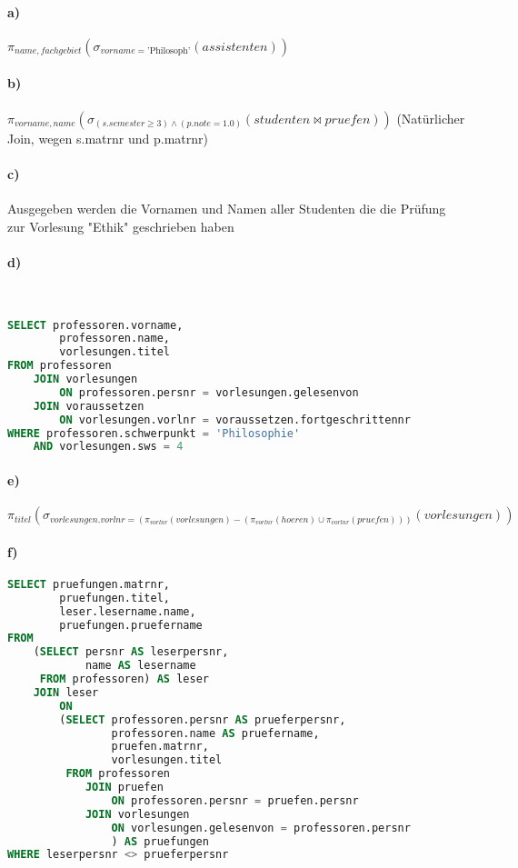 \documentclass[11pt,a4paper,parskip=half ]{scrartcl}
\begin{document}
	\paragraph*{a)} $\pi_{name, fachgebiet}(\sigma_{vorname = \text{'Philosoph'}}(assistenten))$
	
	\paragraph{b)} $\pi_{vorname, name}(\sigma_{(s.semester \geq 3) \wedge (p.note = 1.0)}(studenten\bowtie pruefen))$ (Natürlicher Join, wegen s.matrnr und p.matrnr)
	
	\paragraph{c)}Ausgegeben werden die Vornamen und Namen aller Studenten die die Prüfung zur Vorlesung "Ethik" geschrieben haben
	
	\paragraph{d)}~
	\begin{lstlisting}[language=SQL]
SELECT professoren.vorname, 
		professoren.name, 
		vorlesungen.titel
FROM professoren
	JOIN vorlesungen 
		ON professoren.persnr = vorlesungen.gelesenvon
	JOIN voraussetzen 
		ON vorlesungen.vorlnr = voraussetzen.fortgeschrittennr
WHERE professoren.schwerpunkt = 'Philosophie' 
	AND vorlesungen.sws = 4
	\end{lstlisting}
	
	\paragraph{e)}$\pi_{titel}(\sigma_{vorlesungen.vorlnr = (\pi_{vorlnr}(vorlesungen) - (\pi_{vorlnr}(hoeren) \cup \pi_{vorlnr}(pruefen)))}(vorlesungen))$
	
	\paragraph{f)}
	\begin{lstlisting}[language=SQL]
SELECT pruefungen.matrnr,
		pruefungen.titel,
		leser.lesername.name, 
		pruefungen.pruefername
FROM 
	(SELECT persnr AS leserpersnr, 
			name AS lesername
	 FROM professoren) AS leser
	JOIN leser 
		ON 
		(SELECT professoren.persnr AS prueferpersnr, 
				professoren.name AS pruefername,
				pruefen.matrnr,
				vorlesungen.titel
		 FROM professoren
			JOIN pruefen 
				ON professoren.persnr = pruefen.persnr
			JOIN vorlesungen 
				ON vorlesungen.gelesenvon = professoren.persnr
				) AS pruefungen
WHERE leserpersnr <> prueferpersnr
	\end{lstlisting}
	
\end{document}
